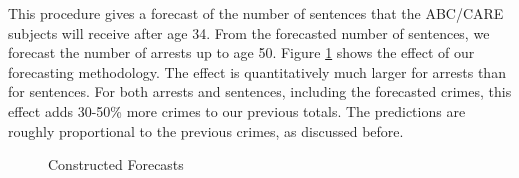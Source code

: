 \noindent This procedure gives a forecast of the number of sentences that the ABC/CARE subjects will receive after age 34. From the forecasted number of sentences, we forecast the number of arrests up to age 50. Figure \ref{fig:predictions} shows the effect of our forecasting methodology. The effect is quantitatively much larger for arrests than for sentences. For both arrests and sentences, including the forecasted crimes, this effect adds 30-50\% more crimes to our previous totals. The predictions are roughly proportional to the previous crimes, as discussed before. 

\begin{figure}[H]
\caption{Constructed Forecasts}
\centering \label{fig:predictions}
{}
\end{figure}

